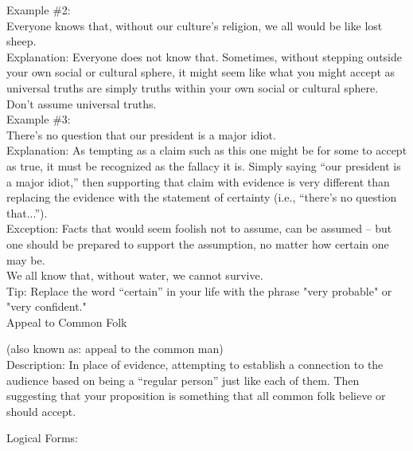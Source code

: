 \documentclass[a4paper,12pt,single,pdftex]{scrbook}
\begin{document}
    
      Example \#2:
    \\

    
      Everyone knows that, without our culture's religion, we all would be like lost sheep.
    \\

    
      Explanation: Everyone does not know that.  Sometimes, without stepping outside your own social or cultural sphere, it might seem like what you might accept as universal truths are simply truths within your own social or cultural sphere.  Don’t assume universal truths.
    \\

    
      Example \#3:
    \\

    
      There’s no question that our president is a major idiot.
    \\

    
      Explanation: As tempting as a claim such as this one might be for some to accept as true, it must be recognized as the fallacy it is. Simply saying “our president is a major idiot,” then supporting that claim with evidence is very different than replacing the evidence with the statement of certainty (i.e., “there’s no question that...”).
    \\

    
      Exception: Facts that would seem foolish not to assume, can be assumed -- but one should be prepared to support the assumption, no matter how certain one may be.
    \\

    
      We all know that, without water, we cannot survive.
    \\

    
      Tip: Replace the word “certain” in your life with the phrase "very probable" or "very confident."
    \\

  

Appeal to Common Folk
    
      (also known as: appeal to the common man)
    \\

  
    Description: In place of evidence, attempting to establish a connection to the audience based on being a “regular person” just like each of them.  Then suggesting that your proposition is something that all common folk believe or should accept.

    
      Logical Forms:
    \\
\end{document}
